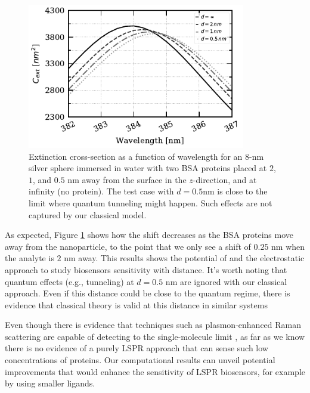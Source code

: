 \begin{figure}%
   \centering
   \includegraphics[width=0.85\textwidth]{2pz_lspr_response.pdf} 
   \caption{Extinction cross-section as a function of wavelength for an $8$-nm
            silver sphere immersed in water with two BSA proteins placed at
            $2$, $1$, and $0.5$ nm away from the surface in the 
            $z$-direction, and at infinity (no protein). The test case with
            $d=0.5$nm is close to the limit where quantum tunneling might happen. 
            Such effects are not captured by our classical model.}
   \label{fig:dist_response}
\end{figure}

As expected, Figure \ref{fig:dist_response} shows how the shift decreases as the BSA 
proteins move away from the nanoparticle, to the point that we only see a shift of 
$0.25$ nm when the analyte is $2$ nm away. This results shows the potential of \pygbe 
and the electrostatic approach to study biosensors sensitivity with distance. It's 
worth noting that quantum effects (e.g., tunneling) at $d=0.5$ nm are ignored with 
our classical approach. Even if this distance could be close to the quantum regime, 
there is evidence that classical theory is valid at this distance in similar systems
\cite{SavageETal2012, EstebanETal2012}

Even though there is evidence that techniques such as plasmon-enhanced Raman 
scattering are capable of detecting to the single-molecule limit 
\cite{ZhangZhangETal2013}, as far as we know there is no evidence of a purely
LSPR approach that can sense such low concentrations of proteins. Our 
computational results can unveil potential improvements that would enhance 
the sensitivity of LSPR biosensors, for example by using smaller ligands. 

